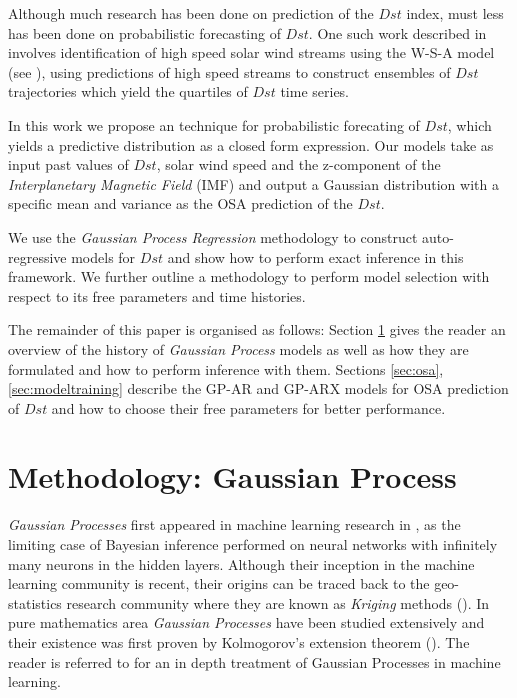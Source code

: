 \documentclass[sw, draft]{AGUTeX}
\begin{document}
\begin{article}
Although much research has been done on prediction of the $Dst$ index, must less has been done on probabilistic forecasting of $Dst$. One such work described in \citet{McPherron:2013} involves identification of high speed solar wind streams using the W-S-A model (see \citet{WSAModel}), using predictions of high speed streams to construct ensembles of $Dst$ trajectories which yield the quartiles of $Dst$ time series.

In this work we propose an technique for probabilistic forecating of $Dst$, which yields a predictive distribution as a closed form expression. Our models take as input past values of $Dst$, solar wind speed and the z-component of the \emph{Interplanetary Magnetic Field} (IMF) and output a Gaussian distribution with a specific mean and variance as the OSA prediction of the $Dst$. 

We use the \emph{Gaussian Process Regression} methodology to construct auto-regressive models for $Dst$ and show how to perform exact inference in this framework. We further outline a methodology to perform model selection with respect to its free parameters and time histories.

The remainder of this paper is organised as follows: Section \ref{sec:method} gives the reader an overview of the history of \emph{Gaussian Process} models as well as how they are formulated and how to perform inference with them. Sections \ref{sec:osa}, \ref{sec:modeltraining} describe the GP-AR and GP-ARX models for OSA prediction of $Dst$ and how to choose their free parameters for better performance. 

\section{Methodology: Gaussian Process} \label{sec:method}

\emph{Gaussian Processes} first appeared in machine learning research in \citet{Neal:1996:BLN:525544}, as the limiting case of Bayesian inference performed on neural networks with infinitely many neurons in the hidden layers. Although their inception in the machine learning community is recent, their origins can be traced back to the geo-statistics research community where they are known as \emph{Kriging} methods (\citet{krige1951statistical}). In pure mathematics area \emph{Gaussian Processes} have been studied extensively and their existence was first proven by Kolmogorov's extension theorem (\citet{tao2011introduction}). The reader is referred to \citet{Rasmussen:2005:GPM:1162254} for an in depth treatment of Gaussian Processes in machine learning.


\end{article}
\end{document}
